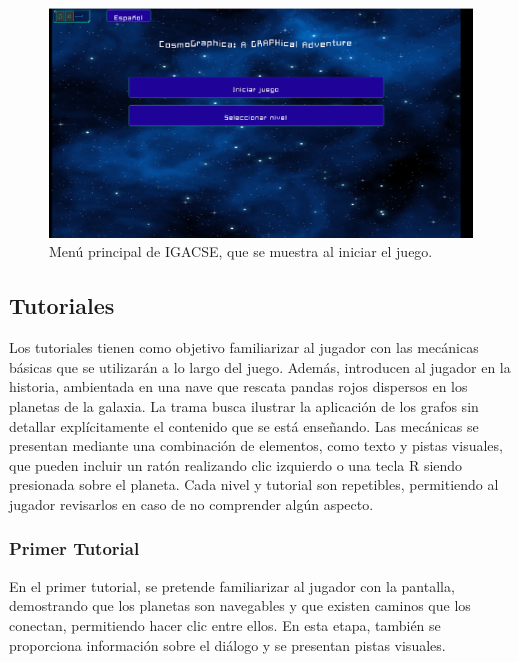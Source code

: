 \begin{figure}[h]
	\centering
	\includegraphics[scale=0.3]{imagenes/MainMenu.png}
	\caption{Menú principal de IGACSE, que se muestra al iniciar el juego.}
	\label{MenuPrincipal}
\end{figure}


\subsection{Tutoriales}

Los tutoriales tienen como objetivo familiarizar al jugador con las mecánicas básicas que se utilizarán a lo largo del juego. Además, introducen al jugador en la historia, ambientada en una nave que rescata pandas rojos dispersos en los planetas de la galaxia. La trama busca ilustrar la aplicación de los grafos sin detallar explícitamente el contenido que se está enseñando. Las mecánicas se presentan mediante una combinación de elementos, como texto y pistas visuales, que pueden incluir un ratón realizando clic izquierdo o una tecla R siendo presionada sobre el planeta. Cada nivel y tutorial son repetibles, permitiendo al jugador revisarlos en caso de no comprender algún aspecto.

\subsubsection{Primer Tutorial}

En el primer tutorial, se pretende familiarizar al jugador con la pantalla, demostrando que los planetas son navegables y que existen caminos que los conectan, permitiendo hacer clic entre ellos. En esta etapa, también se proporciona información sobre el diálogo y se presentan pistas visuales.


